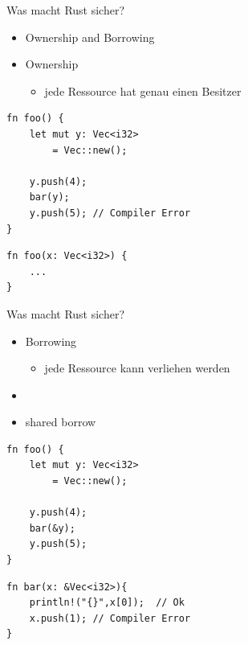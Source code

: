 \documentclass[12pt]{beamer}
\begin{document}
\begin{frame}[fragile=singleslide]{Was macht Rust sicher?}
	\begin{itemize}
	    \item Ownership and Borrowing
	\end{itemize}
	\begin{itemize}
	    \item Ownership
	    \begin{itemize}
	        \item jede Ressource hat genau einen Besitzer
	    \end{itemize}    
	\end{itemize}
\begin{center}
\hspace{3pt}
\begin{minipage}[t]{.47\textwidth}
\begin{lstlisting}
fn foo() {	
	let mut y: Vec<i32> 
		= Vec::new();
		
	y.push(4);	
	bar(y);	
	y.push(5); // Compiler Error	
}
\end{lstlisting}				
\end{minipage}
\hspace{3pt}
\begin{minipage}[t]{.47\textwidth}
\begin{lstlisting}
fn foo(x: Vec<i32>) {	
	...
}
\end{lstlisting}				
\end{minipage}
\end{center}
\end{frame}

\begin{frame}[fragile=singleslide]{Was macht Rust sicher?}
	\begin{itemize}
	    \item Borrowing
	    \begin{itemize}
	        \item jede Ressource kann verliehen werden
	    \end{itemize}
	    \item[]
	    \item shared borrow  
	\end{itemize}
\begin{center}
\hspace{3pt}
\begin{minipage}[t]{.47\textwidth}
\begin{lstlisting}
fn foo() {	
	let mut y: Vec<i32> 
		= Vec::new();
		
	y.push(4);	
	bar(&y);	
	y.push(5);	
}
\end{lstlisting}				
\end{minipage}
\hspace{3pt}
\begin{minipage}[t]{.47\textwidth}
\begin{lstlisting}
fn bar(x: &Vec<i32>){
	println!("{}",x[0]);  // Ok	
	x.push(1); // Compiler Error
}
\end{lstlisting}				
\end{minipage}
\end{center}
\end{frame}
\end{document}

